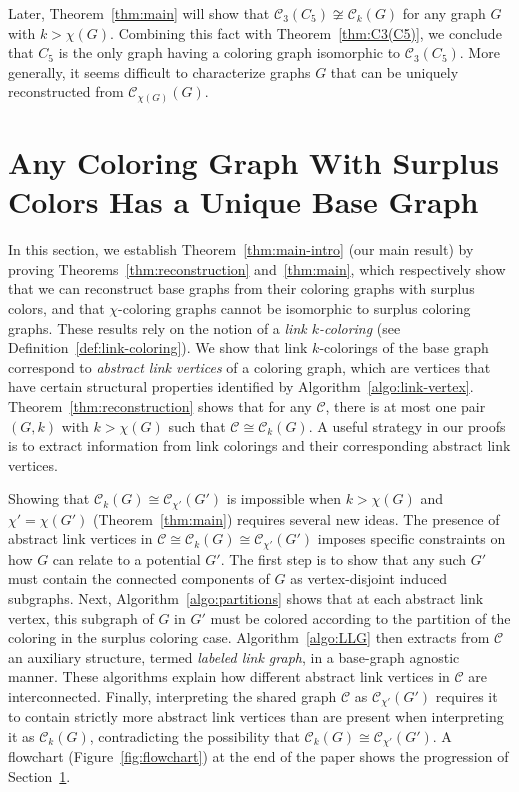 \documentclass{amsart}
\theoremstyle{hypothesisstyle}
\theoremstyle{definition}
\theoremstyle{remark}
\numberwithin{equation}{section}
\newcommand{\C}{\mathcal C}
\begin{document}
Later, Theorem~\ref{thm:main} will show that $\mathcal{C}_3(C_5)\not\cong \mathcal{C}_k(G)$ for any graph $G$ with $k>\chi(G)$. Combining this fact with Theorem~\ref{thm:C3(C5)}, we conclude that $C_5$ is the only graph having a coloring graph isomorphic to $\mathcal{C}_3(C_5)$. More generally, it seems difficult to characterize graphs $G$ that can be uniquely reconstructed from $\mathcal{C}_{\chi(G)}(G)$.

\section{Any Coloring Graph With Surplus Colors Has a Unique Base Graph}\label{sec:unique-if-surplus}

In this section, we establish Theorem~\ref{thm:main-intro} (our main result) by proving Theorems~\ref{thm:reconstruction} and~\ref{thm:main}, which respectively show that we can reconstruct base graphs from their coloring graphs with surplus colors, and that $\chi$-coloring graphs cannot be isomorphic to surplus coloring graphs. These results rely on the notion of a {\em link $k$-coloring} (see Definition~\ref{def:link-coloring}). We show that link $k$-colorings of the base graph correspond to {\em abstract link vertices} of a coloring graph, which are vertices that have certain structural properties identified by Algorithm~\ref{algo:link-vertex}. Theorem~\ref{thm:reconstruction} shows that for any $\C$, there is at most one pair $(G, k)$ with $k>\chi(G)$ such that $\C\cong\mathcal C_{k}(G)$. A useful strategy in our proofs is to extract information from link colorings and their corresponding abstract link vertices. 

Showing that $\C_k(G)\cong \C_{\chi'}(G')$ is impossible when $k>\chi(G)$ and $\chi'=\chi(G')$ (Theorem~\ref{thm:main}) requires several new ideas. The presence of abstract link vertices in $\C\cong \C_k(G)\cong \C_{\chi'}(G')$ imposes specific constraints on how $G$ can relate to a potential $G'$. The first step is to show that any such $G'$ must contain the connected components of $G$ as vertex-disjoint induced subgraphs. Next, Algorithm~\ref{algo:partitions} shows that at each abstract link vertex, this subgraph of $G$ in $G'$ must be colored according to the partition of the coloring in the surplus coloring case. Algorithm~\ref{algo:LLG} then extracts from $\C$ an auxiliary structure, termed \emph{labeled link graph}, in a base-graph agnostic manner. These algorithms explain how different abstract link vertices in $\mathcal{C}$ are interconnected. Finally, interpreting the shared graph $\mathcal{C}$ as $\mathcal{C}_{\chi'}(G')$ requires it to contain strictly more abstract link vertices than are present when interpreting it as $\mathcal{C}_{k}(G)$, contradicting the possibility that $\mathcal{C}_k(G)\cong  \mathcal{C}_{\chi'}(G')$. A flowchart (Figure~\ref{fig:flowchart}) at the end of the paper shows the progression of Section~\ref{sec:unique-if-surplus}.
\end{document}

